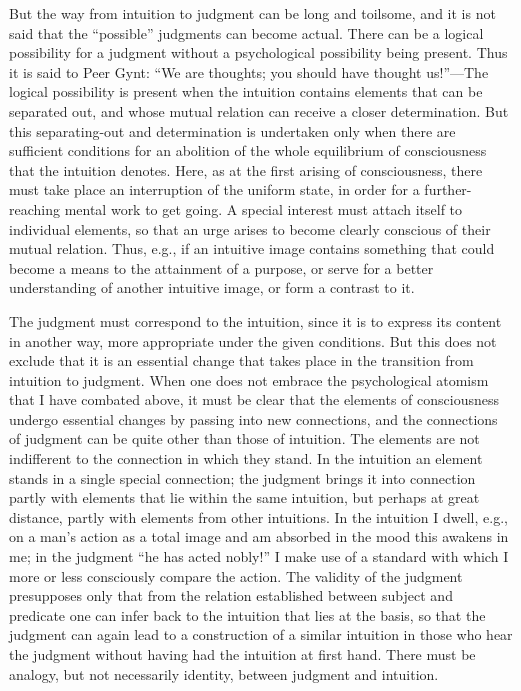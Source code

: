 \documentclass[12pt,a4paper]{book}
\newcommand{\opage}[1]{\marginnote{\footnotesize\textit{[#1]}}}
\begin{document}
But the way from intuition to judgment can be long and toilsome, and it is
not said that the ``possible'' judgments can become actual. There can be a
logical possibility for a judgment without a psychological possibility
being present. Thus it is said to Peer Gynt: ``We are thoughts; you should
have thought us!''---The logical possibility is present when the intuition
contains elements that can be separated out, and whose mutual relation can
receive a closer determination. But this separating-out and determination
is undertaken only when there are sufficient conditions for an abolition of
the whole equilibrium of consciousness that the intuition denotes. Here, as
at the first arising of consciousness, there must take place an
interruption of the uniform state, in order for a further-reaching mental
work to get going. A special interest must attach itself to individual
elements, so that an urge arises to become clearly conscious of their
mutual relation. Thus, e.g., if an intuitive image contains something that
could become a means to the attainment of a purpose, or serve for a better
understanding of another intuitive image, or form a contrast to it.

The judgment must correspond to the intuition, since it is to express its
content in another way, more appropriate under the given conditions. But
this does not exclude that it is an essential change that takes place in
the transition from intuition to judgment. When one does not embrace the
psychological atomism that I have combated above, it must be clear that the
elements of consciousness undergo essential changes by passing into new
connections, and the connections of judgment can be quite other than those
of intuition. The elements are not indifferent to the connection in which
they stand. In the intuition an element stands in a \opage{59}single special
connection; the judgment brings it into connection partly with elements
that lie within the same intuition, but perhaps at great distance, partly
with elements from other intuitions. In the intuition I dwell, e.g., on a
man's action as a total image and am absorbed in the mood this awakens in
me; in the judgment ``he has acted nobly!'' I make use of a standard with
which I more or less consciously compare the action. The validity of the
judgment presupposes only that from the relation established between subject
and predicate one can infer back to the intuition that lies at the basis,
so that the judgment can again lead to a construction of a similar
intuition in those who hear the judgment without having had the intuition
at first hand. There must be analogy, but not necessarily identity, between
judgment and intuition.
\end{document}
